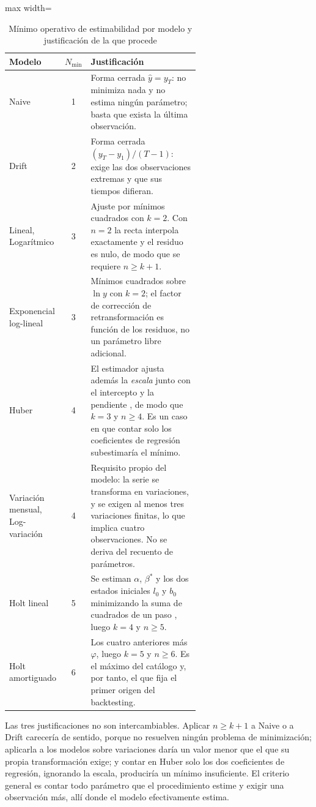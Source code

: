 \documentclass[12pt,letterpaper]{article}
\providecommand{\parencite}{\citep}
\begin{document}
\begin{table}[H]
\centering
\caption{Mínimo operativo de estimabilidad por modelo y justificación de la que procede}
\label{tab:nmin_por_modelo}
\vspace{\baselineskip}
\scriptsize
\begin{adjustbox}{max width=\textwidth}
\begin{tabular}{lcp{0.62\linewidth}}
\toprule
\textbf{Modelo} & \textbf{\(N_{\min}\)} & \textbf{Justificación} \\
\midrule
Naive & 1 & Forma cerrada \(\hat{y}=y_T\): no minimiza nada y no estima ningún parámetro; basta que exista la última observación. \\
Drift & 2 & Forma cerrada \((y_T-y_1)/(T-1)\): exige las dos observaciones extremas y que sus tiempos difieran. \\
Lineal, Logarítmico & 3 & Ajuste por mínimos cuadrados con \(k=2\). Con \(n=2\) la recta interpola exactamente y el residuo es nulo, de modo que se requiere \(n \geq k+1\). \\
Exponencial log-lineal & 3 & Mínimos cuadrados sobre \(\ln y\) con \(k=2\); el factor de corrección de retransformación es función de los residuos, no un parámetro libre adicional. \\
Huber & 4 & El estimador ajusta además la \emph{escala} junto con el intercepto y la pendiente \parencite{sklearn_huberregressor}, de modo que \(k=3\) y \(n \geq 4\). Es un caso en que contar solo los coeficientes de regresión subestimaría el mínimo. \\
Variación mensual, Log-variación & 4 & Requisito propio del modelo: la serie se transforma en variaciones, y se exigen al menos tres variaciones finitas, lo que implica cuatro observaciones. No se deriva del recuento de parámetros. \\
Holt lineal & 5 & Se estiman \(\alpha\), \(\beta^{*}\) y los dos estados iniciales \(l_0\) y \(b_0\) minimizando la suma de cuadrados de un paso \parencite{hyndman2021fpp3}, luego \(k=4\) y \(n \geq 5\). \\
Holt amortiguado & 6 & Los cuatro anteriores más \(\varphi\), luego \(k=5\) y \(n \geq 6\). Es el máximo del catálogo y, por tanto, el que fija el primer origen del backtesting. \\
\bottomrule
\end{tabular}
\end{adjustbox}
\end{table}

Las tres justificaciones no son intercambiables. Aplicar \(n \geq k+1\) a Naive o a Drift carecería de sentido, porque no resuelven ningún problema de minimización; aplicarla a los modelos sobre variaciones daría un valor menor que el que su propia transformación exige; y contar en Huber solo los dos coeficientes de regresión, ignorando la escala, produciría un mínimo insuficiente. El criterio general es contar todo parámetro que el procedimiento estime y exigir una observación más, allí donde el modelo efectivamente estima.
\end{document}
